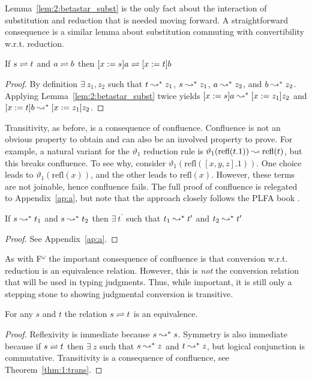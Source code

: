 Lemma~\ref{lem:2:betastar_subst} is the only fact about the interaction of substitution and reduction that is needed moving forward.
A straightforward consequence is a similar lemma about substitution commuting with convertibility w.r.t. reduction.

\begin{lemma}
    If $s \rightleftharpoons t$ and $a \rightleftharpoons b$ then $[x := s]a \rightleftharpoons [x := t]b$
    \label{lem:2:betaconv_subst}
\end{lemma}
\begin{proof}
    By definition $\exists\ z_1, z_2$ such that $t \leadsto^* z_1$, $s \leadsto^* z_1$, $a \leadsto^* z_2$, and $b \leadsto^* z_2$.
    Applying Lemma~\ref{lem:2:betastar_subst} twice yields $[x := s]a \leadsto^* [x := z_1]z_2$ and $[x := t]b \leadsto^* [x := z_1]z_2$.
\end{proof}

Transitivity, as before, is a consequence of confluence.
Confluence is not an obvious property to obtain and can also be an involved property to prove.
For example, a natural variant for the $\vartheta_1$ reduction rule is $\vartheta_1(\text{refl}(t.1)) \leadsto \text{refl}(t)$, but this breaks confluence.
To see why, consider $\vartheta_1(\text{refl}([x, y, z].1))$.
One choice leads to $\vartheta_1(\text{refl}(x))$, and the other leads to $\text{refl}(x)$.
However, these terms are not joinable, hence confluence fails.
The full proof of confluence is relegated to Appendix~\ref{ap:a}, but note that the approach closely follows the PLFA book \cite{plfa22.08}.

\begin{lemma}[Confluence]
    If $s \leadsto^* t_1$ and $s \leadsto^* t_2$ then $\exists\ t^\prime$ such that $t_1 \leadsto^* t^\prime$ and $t_2 \leadsto^* t^\prime$
\end{lemma}
\begin{proof}
    See Appendix~\ref{ap:a}.
\end{proof}

As with F$^\omega$ the important consequence of confluence is that conversion w.r.t. reduction is an equivalence relation.
However, this is \textit{not} the conversion relation that will be used in typing judgments.
Thus, while important, it is still only a stepping stone to showing judgmental conversion is transitive.

\begin{lemma}
    For any $s$ and $t$ the relation $s \rightleftharpoons t$ is an equivalence.
    \label{lem:2:beta_conv_equivalence}
\end{lemma}
\begin{proof}
    Reflexivity is immediate because $s \leadsto^* s$.
    Symmetry is also immediate because if $s \rightleftharpoons t$ then $\exists\ z$ such that $s \leadsto^* z$ and $t \leadsto^* z$, but logical conjunction is commutative.
    Transitivity is a consequence of confluence, see Theorem~\ref{thm:1:trans}.
\end{proof}

